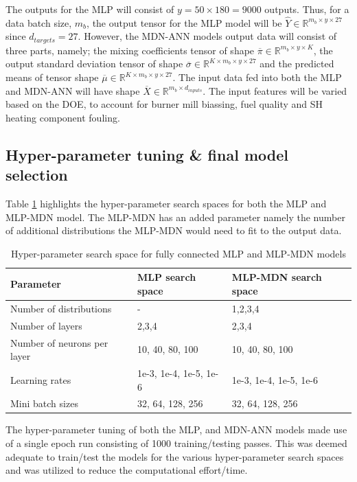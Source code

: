 \documentclass[a4paper,fleqn]{cas-dc}
\begin{document}
The outputs for the MLP will consist of $y=50\times180=9000$ outputs. Thus, for a data batch size, $m_b$, the output tensor for the MLP model will be $\hat{Y}\in \mathbb{R}^{m_b\times y\times 27}$ since $d_{targets}=27$. However, the MDN-ANN models output data will consist of three parts, namely; the mixing coefficients tensor of shape  $\overline{\pi}\in \mathbb{R}^{m_b \times y\times K}$, the output standard deviation tensor of shape $\overline{\sigma}\in \mathbb{R}^{K\times m_b\times y\times 27}$ and the predicted means of tensor shape $\overline{\mu}\in \mathbb{R}^{K\times m_b\times y\times 27}$. The input data fed into both the MLP and MDN-ANN will have shape $\overline{X}\in \mathbb{R}^{m_b\times d_{inputs}}$. The input features will be varied based on the DOE, to account for burner mill biassing, fuel quality and SH heating component fouling.\\
\subsection{Hyper-parameter tuning \& final model selection}\label{sec_hyper}
Table \ref{tbl_tuning} highlights the hyper-parameter search spaces for both the MLP and MLP-MDN model. The MLP-MDN has an added parameter namely the number of additional distributions the MLP-MDN would need to fit to the output data. \\

\begin{table}[h!]
\caption{Hyper-parameter search space for fully connected MLP and MLP-MDN models}\label{tbl_tuning}
\begin{tabular*}{\tblwidth}{p{}p{}p{}}
\toprule
 Parameter& MLP search space & MLP-MDN search space \\ %
\midrule
 Number of distributions & - & 1,2,3,4  \\
 Number of layers & 2,3,4 & 2,3,4\\
 Number of neurons per layer & 10, 40, 80, 100  & 10, 40, 80, 100\\
 Learning rates & 1e-3, 1e-4, 1e-5, 1e-6 &  1e-3, 1e-4, 1e-5, 1e-6   \\
 Mini batch sizes  &32, 64, 128, 256 &32, 64, 128, 256  \\
\bottomrule
\end{tabular*}
\end{table}

The hyper-parameter tuning of both the MLP, and MDN-ANN models made use of a single epoch run consisting of 1000 training/testing passes. This was deemed adequate to train/test the models for the various hyper-parameter search spaces and was utilized to reduce the computational effort/time.\\
\end{document}
